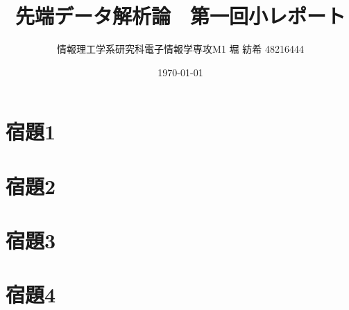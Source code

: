 \documentclass[a4paper,11pt]{jsarticle}
\begin{document}
  \title{先端データ解析論　第一回小レポート}
  \author{情報理工学系研究科電子情報学専攻M1 堀 紡希 48216444}
  \date{\today}
  \maketitle

  \section*{宿題1}

  \section*{宿題2}

  \section*{宿題3}

  \section*{宿題4}
\end{document}
